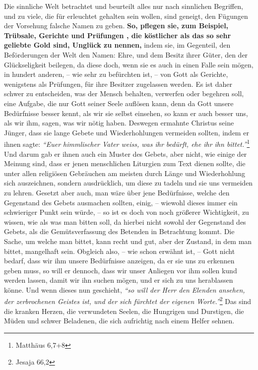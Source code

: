 \medskip

\label{ref:06_13_auf_die_probe_gestellt}
Die sinnliche Welt betrachtet und beurteilt alles nur nach sinnlichen
Begriffen, und zu viele, die für erleuchtet 
gehalten sein wollen, sind
geneigt, den Fügungen der Vorsehung falsche Namen zu geben.
\textbf{So, pflegen
sie, zum
Beispiel, Trübsale, Gerichte und Prüfungen , die köstlicher
als das so sehr
geliebte Gold sind, Unglück  zu nennen,} indem sie, im
Gegenteil, den
Beförderungen der Welt den Namen: Ehre, und dem Besitz ihrer Güter, den der
Glückseligkeit  beilegen, da diese doch, wenn sie es auch
in einen Falle sein
mögen, in hundert anderen, -- wie sehr zu befürchten ist, -- von Gott als
Gerichte, wenigstens als Prüfungen, für ihre Besitzer zugelassen
werden. Es ist
daher schwer zu entscheiden, was der Mensch behalten, verwerfen oder begehren
soll, eine Aufgabe, die nur Gott seiner Seele auflösen
kann, denn da Gott unsere
Bedürfnisse  besser kennt, als wir sie
selbst einsehen, so kann er auch besser
uns, als wir ihm, sagen, was wir nötig haben. Deswegen ermahnte Christus seine
Jünger, dass sie lange Gebete und Wiederhohlungen vermeiden sollten, indem er
ihnen sagte:
\textit{"`Euer himmlischer Vater weiss, was ihr bedürft, ehe ihr ihn
bittet."'}\footnote{Matthäus 6,7+8}
Und darum gab er ihnen auch ein Muster des
Gebets, aber nicht, wie einige der Meinung sind, dass er jenen menschlichen
Liturgien zum Text dienen sollte, die unter allen religiösen Gebräuchen am
meisten durch Länge und Wiederhohlung sich auszeichnen, sondern ausdrücklich,
um diese zu tadeln und sie uns vermeiden zu lehren. Gesetzt aber auch, man wäre
über jene Bedürfnisse, welche den Gegenstand des Gebets ausmachen sollten,
einig, -- wiewohl dieses immer ein schwieriger Punkt sein würde, -- so ist es
doch von noch größerer Wichtigkeit, zu wissen, wie als was man bitten soll, da
hierbei nicht sowohl der Gegenstand des Gebets, als die Gemütsverfassung des
Betenden in Betrachtung kommt. Die Sache, um welche man bittet, kann recht und
gut, aber der Zustand, in dem man bittet, mangelhaft sein. Obgleich also, -- wie
schon erwähnt ist, -- Gott nicht bedarf, dass wir ihm unsere Bedürfnisse
anzeigen, da er sie uns zu erkennen geben muss, so will er dennoch, dass wir
unser Anliegen vor ihm sollen kund werden lassen, damit wir ihn suchen mögen,
und er sich zu uns herablassen könne. Und wenn dieses nun geschieht,
\textit{"`so will der Herr den Elenden ansehen, der zerbrochenen Geistes ist,
und der sich fürchtet der eigenen Worte."'}\footnote{Jesaja 66,2}
Das sind die kranken Herzen, die
verwundeten Seelen, die Hungrigen und Durstigen, die Müden
und schwer Beladenen,
die sich aufrichtig nach einem Helfer sehnen.

